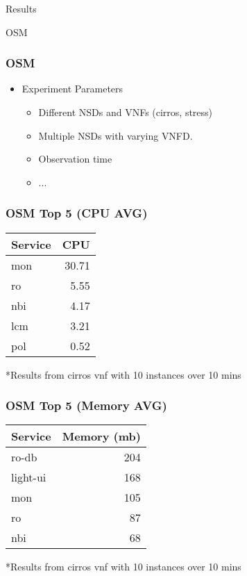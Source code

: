 \begin{frame}
\Huge{\centerline{Results}}
\Huge{\centerline{OSM}}
\end{frame}

\begin{frame}
\frametitle{OSM}
\begin{itemize}
	
	\item Experiment Parameters

	\begin{itemize}
		\item Different NSDs and VNFs (cirros, stress)
		\item Multiple NSDs with varying VNFD.
		\item Observation time
		\item ...
	\end{itemize}
	

	
\end{itemize}
\end{frame}

\begin{frame}
\frametitle{OSM Top 5 (CPU AVG)}
\begin{table}
	\begin{tabular}{l r}
		\toprule
		\textbf{Service} & \textbf{CPU} \\
		\midrule
		mon & 30.71  \\
		ro & 5.55  \\
		nbi & 4.17  \\
		lcm & 3.21  \\
		pol & 0.52\\
		\bottomrule
	\end{tabular}
\end{table}
{ *Results from cirros vnf with 10 instances over 10 mins}
\end{frame}


\begin{frame}
\frametitle{OSM Top 5 (Memory AVG)}
\begin{table}
\begin{tabular}{l r}
	\toprule
	\textbf{Service} & \textbf{Memory (mb)}\\
	\midrule
	ro-db & 204 \\
	light-ui & 168 \\
	mon & 105 \\
	ro & 87 \\
	nbi & 68 \\
	\bottomrule
\end{tabular}
\end{table}
{ *Results from cirros vnf with 10 instances over 10 mins}
\end{frame}





